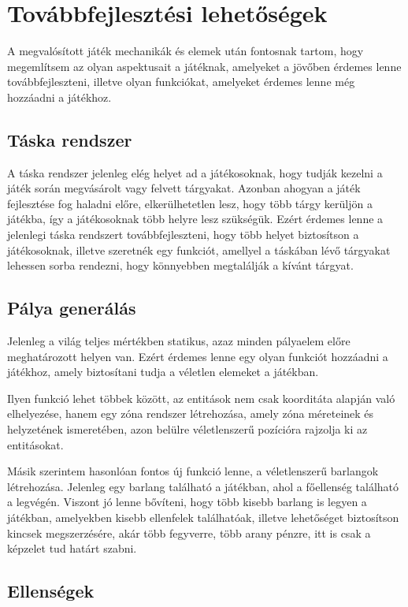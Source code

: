 \chapter{Továbbfejlesztési lehetőségek}

 A megvalósított játék mechanikák és elemek után fontosnak tartom, hogy megemlítsem az olyan aspektusait a játéknak, amelyeket a jövőben érdemes lenne továbbfejleszteni, illetve olyan funkciókat, amelyeket érdemes lenne még hozzáadni a játékhoz.


\section{Táska rendszer}
 A táska rendszer jelenleg elég helyet ad a játékosoknak, hogy tudják kezelni a játék során megvásárolt vagy felvett tárgyakat. Azonban ahogyan a játék fejlesztése fog haladni előre, elkerülhetetlen lesz, hogy több tárgy kerüljön a játékba, így a játékosoknak több helyre lesz szükségük. Ezért érdemes lenne a jelenlegi táska rendszert továbbfejleszteni, hogy több helyet biztosítson a játékosoknak, illetve szeretnék egy funkciót, amellyel a táskában lévő tárgyakat lehessen sorba rendezni, hogy könnyebben megtalálják a kívánt tárgyat.

\section{Pálya generálás}
 Jelenleg a világ teljes mértékben statikus, azaz minden pályaelem előre meghatározott helyen van. Ezért érdemes lenne egy olyan funkciót hozzáadni a játékhoz, amely biztosítani tudja a véletlen elemeket a játékban.

Ilyen funkció lehet többek között, az entitások nem csak koorditáta alapján való elhelyezése, hanem egy zóna rendszer létrehozása, amely zóna méreteinek és helyzetének ismeretében, azon belülre véletlenszerű pozícióra rajzolja ki az entitásokat.

Másik szerintem hasonlóan fontos új funkció lenne, a véletlenszerű barlangok létrehozása. Jelenleg egy barlang található a játékban, ahol a főellenség található a legvégén. Viszont jó lenne bővíteni, hogy több kisebb barlang is legyen a játékban, amelyekben kisebb ellenfelek találhatóak, illetve lehetőséget biztosítson kincsek megszerzésére, akár több fegyverre, több arany pénzre, itt is csak a képzelet tud határt szabni.

\section{Ellenségek}

